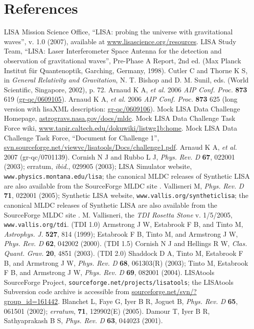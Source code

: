 \documentclass[12pt]{iopart}
\begin{document}
\section*{References}
\begin{thebibliography}{10}
 LISA Mission Science Office, ``LISA: probing the universe with gravitational waves'', v. 1.0 (2007), available at \url{www.lisascience.org/resources}.
 LISA Study Team, ``LISA: Laser Interferometer Space Antenna for the detection and observation of gravitational waves'', Pre-Phase A Report, 2nd ed. (Max Planck Institut f\"ur Quantenoptik, Garching, Germany, 1998).
%
 Cutler C and Thorne K S, in \emph{General Relativity and Gravitation}, N. T. Bishop and D. M. Sunil, eds. (World Scientific, Singapore, 2002), p. 72.
 Arnaud K A, {\it et al.} 2006 {\it AIP Conf. Proc.} {\bf 873} 619 (\url{gr-qc/0609105}).
 Arnaud K A, {\it et al.} 2006 {\it AIP Conf. Proc.} {\bf 873} 625 (long version with lisaXML description: \url{gr-qc/0609106}).
 Mock LISA Data Challenge Homepage, \url{astrogravs.nasa.gov/docs/mldc}.
 Mock LISA Data Challenge Task Force wiki, \url{www.tapir.caltech.edu/dokuwiki/listwg1b:home}.
 Mock LISA Data Challenge Task Force, ``Document for Challenge 1'', \url{svn.sourceforge.net/viewvc/lisatools/Docs/challenge1.pdf}.
 Arnaud K A, {\it et al.} 2007 (gr-qc/0701139).
 Cornish N J and Rubbo L J, \emph{Phys. Rev. D} \textbf{67}, 022001 (2003); erratum, \emph{ibid.}, 029905 (2003); LISA Simulator website, \texttt{www.physics.montana.edu/lisa}; the canonical MLDC releases of Synthetic LISA are also available from the SourceForge MLDC site \cite{lisatools}.
 Vallisneri M, \emph{Phys. Rev. D} \textbf{71}, 022001 (2005); Synthetic LISA website, \texttt{www.vallis.org/syntheticlisa}; the canonical MLDC releases of Synthetic LISA are also available from the SourceForge MLDC site \cite{lisatools}.
 M. Vallisneri, the \emph{TDI Rosetta Stone} v. 1/5/2005, \texttt{www.vallis.org/tdi}.
 (TDI 1.0) Armstrong J W, Estabrook F B, and Tinto M,
\emph{Astrophys. J.} \textbf{527}, 814 (1999); Estabrook F B, Tinto M, and Armstrong J W, \emph{Phys. Rev. D} \textbf{62}, 042002 (2000).
 (TDI 1.5) Cornish N J and Hellings R W, \emph{Clas. Quant. Grav.} \textbf{20}, 4851 (2003).
 (TDI 2.0) Shaddock D A, Tinto M, Estabrook F B, and Armstrong J W, \emph{Phys. Rev. D} \textbf{68}, 061303(R) (2003); Tinto M, Estabrook F B, and Armstrong J W, \emph{Phys. Rev. D} \textbf{69}, 082001 (2004).
 LISAtools SourceForge Project, \texttt{sourceforge.net/projects/lisatools}; the LISAtools Subversion code archive is accessible from 
\url{sourceforge.net/svn/?group_id=161442}.
 Blanchet L, Faye G, Iyer B R, Joguet B, \emph{Phys. Rev. D} \textbf{65}, 061501 (2002); \emph{erratum}, \textbf{71}, 129902(E) (2005).
 Damour T, Iyer B R, Sathyaprakash B S, \emph{Phys. Rev. D} \textbf{63}, 044023 (2001).


\end{thebibliography}
\end{document}
